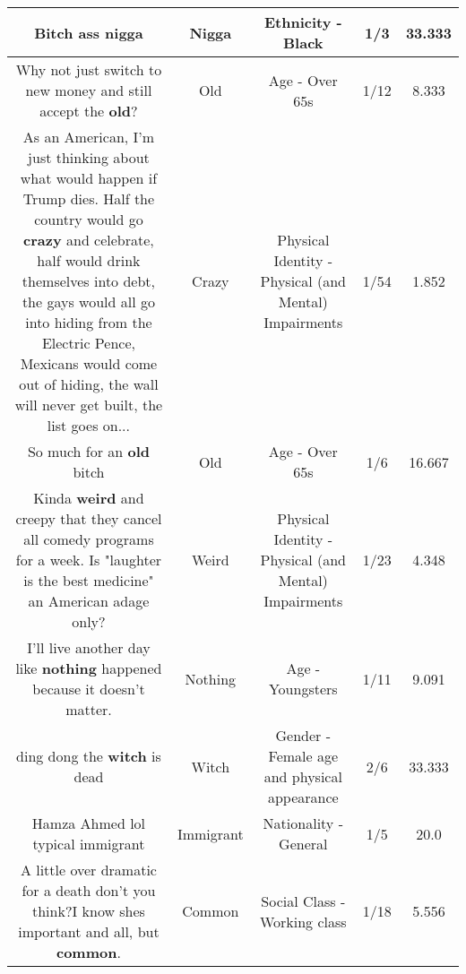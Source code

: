 \documentclass[11pt]{article}
\newlength\mylength
\begin{document}
\begin{center}
\begin{longtable}{|C{.65\mylength}|C{.30\mylength}|C{.12\mylength}|C{.12\mylength}|C{.12\mylength}|}
  \small Bitch ass nigga\normalsize   & Nigga & Ethnicity - Black & 1/3 & 33.333 \\  \hline
  \small Why not just switch to new money and still accept the \textbf{old}?\normalsize   & Old & Age - Over 65s & 1/12 & 8.333 \\  \hline
  \small As an American, I'm just thinking about what would happen if Trump dies. Half the country would go \textbf{crazy} and celebrate, half would drink themselves into debt, the gays would all go into hiding from the Electric Pence, Mexicans would come out of hiding, the wall will never get built, the list goes on...\normalsize   & Crazy & Physical Identity - Physical (and Mental) Impairments & 1/54 & 1.852 \\  \hline
  \small So much for an \textbf{old} bitch\normalsize   & Old & Age - Over 65s & 1/6 & 16.667 \\  \hline
  \small Kinda \textbf{weird} and creepy that they cancel all comedy programs for a week. Is "laughter is the best medicine" an American adage only?\normalsize   & Weird & Physical Identity - Physical (and Mental) Impairments & 1/23 & 4.348 \\  \hline
  \small I'll live another day like \textbf{nothing} happened because it doesn't matter.\normalsize   & Nothing & Age - Youngsters & 1/11 & 9.091 \\  \hline
  \small ding dong the \textbf{witch} is dead\normalsize   & Witch & Gender - Female age and physical appearance & 2/6 & 33.333 \\  \hline
  \small Hamza Ahmed lol typical immigrant\normalsize   & Immigrant & Nationality - General & 1/5 & 20.0 \\  \hline
  \small A little over dramatic for a death don't you think?I know shes important and all, but \textbf{common}.\normalsize   & Common & Social Class - Working class & 1/18 & 5.556 \\  \hline

\end{longtable}
\end{center}
\end{document}
